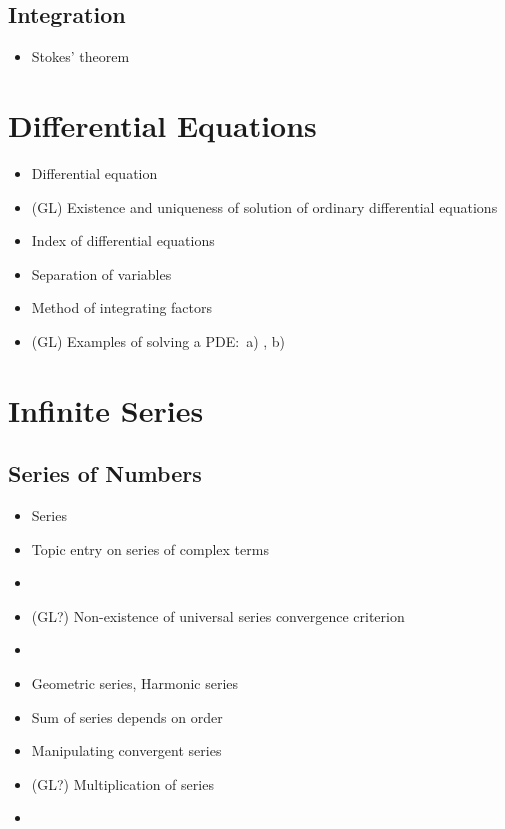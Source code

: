 \documentclass[12pt]{article}
\theoremstyle{definition}
\begin{document}
\subsection{Integration}
\begin{itemize}
\item Stokes' theorem
\end{itemize}

\section{Differential Equations}
\begin{itemize}
\item Differential equation
\item (GL) Existence and uniqueness of solution of ordinary differential equations
\item Index of differential equations
\item Separation of variables
\item Method of integrating factors
\item (GL) Examples of solving a PDE:\, 
 a) , 
b)  
\end{itemize}

\section{Infinite Series}

\subsection{Series of Numbers}
\begin{itemize}
\item Series
\item Topic entry on series of complex terms
\item {}
\item (GL?) Non-existence of universal series convergence criterion
\item {}
\item Geometric series, Harmonic series
\item Sum of series depends on order
\item Manipulating convergent series
\item (GL?) Multiplication of series
\item {}
\end{itemize}
\end{document}
